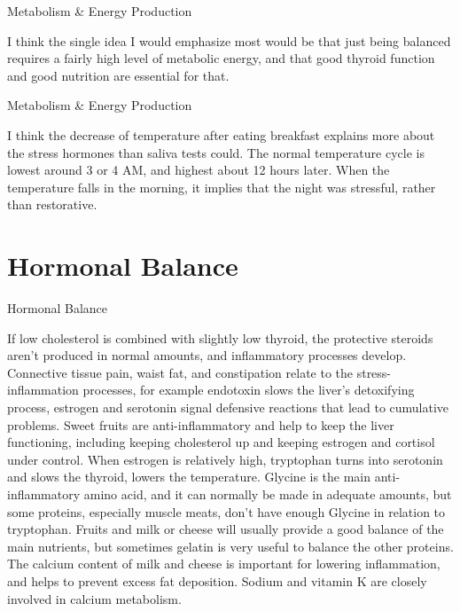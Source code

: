 \documentclass[11pt,oneside,openany,extrafontsizes]{memoir}
\begin{document}
\begin{standalonequote}{Metabolism \& Energy Production}

    \begin{answer}
      I think the single idea I would emphasize most would be that just being balanced requires a fairly high level of metabolic energy, and that good thyroid function and good nutrition are essential for that.
    \end{answer}
\end{standalonequote}

\begin{standalonequote}{Metabolism \& Energy Production}

    \begin{answer}
      I think the decrease of temperature after eating breakfast explains more about the stress hormones than saliva tests could. The normal temperature cycle is lowest around 3 or 4 AM, and highest about 12 hours later. When the temperature falls in the morning, it implies that the night was stressful, rather than restorative.
    \end{answer}
\end{standalonequote}

\section{Hormonal Balance}

\begin{standalonequote}{Hormonal Balance}

    \begin{answer}
        If low cholesterol is combined with slightly low thyroid, the protective steroids aren't produced in normal amounts, and inflammatory processes develop. Connective tissue pain, waist fat, and constipation relate to the stress-inflammation processes, for example endotoxin slows the liver's detoxifying process, estrogen and serotonin signal defensive reactions that lead to cumulative problems. Sweet fruits are anti-inflammatory and help to keep the liver functioning, including keeping cholesterol up and keeping estrogen and cortisol under control. When estrogen is relatively high, tryptophan turns into serotonin and slows the thyroid, lowers the temperature. Glycine is the main anti-inflammatory amino acid, and it can normally be made in adequate amounts, but some proteins, especially muscle meats, don't have enough Glycine in relation to tryptophan. Fruits and milk or cheese will usually provide a good balance of the main nutrients, but sometimes gelatin is very useful to balance the other proteins. The calcium content of milk and cheese is important for lowering inflammation, and helps to prevent excess fat deposition. Sodium and vitamin K are closely involved in calcium metabolism.
    \end{answer}
\end{standalonequote}
\end{document}
